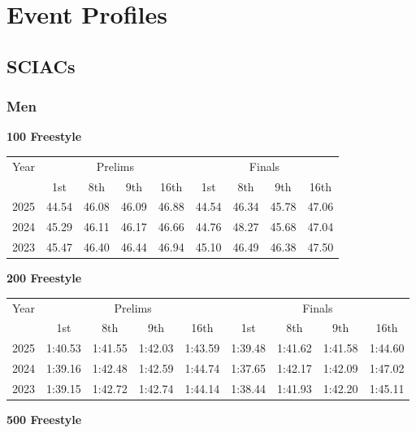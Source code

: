 \section{Event Profiles}

\subsection{SCIACs}

\subsubsection{Men}

\textbf{100 Freestyle}

\begin{flushleft}
\begin{tabular}{|c|c|c|c|c|c|c|c|c|}
\hline
Year & \multicolumn{4}{c|}{Prelims} & \multicolumn{4}{c|}{Finals} \\
\cline{2-9}
& 1st & 8th & 9th & 16th & 1st & 8th & 9th & 16th \\
\hline
2025 & 44.54 & 46.08 & 46.09 & 46.88 & 44.54 & 46.34 & 45.78 & 47.06 \\
2024 & 45.29 & 46.11 & 46.17 & 46.66 & 44.76 & 48.27 & 45.68 & 47.04  \\
2023 & 45.47 & 46.40 & 46.44 & 46.94 & 45.10 & 46.49 & 46.38 & 47.50 \\
\hline
\end{tabular}
\end{flushleft}

\textbf{200 Freestyle}

\begin{flushleft}
\begin{tabular}{|c|c|c|c|c|c|c|c|c|}
\hline
Year & \multicolumn{4}{c|}{Prelims} & \multicolumn{4}{c|}{Finals} \\
\cline{2-9}
& 1st & 8th & 9th & 16th & 1st & 8th & 9th & 16th \\
\hline
2025 & 1:40.53 & 1:41.55 & 1:42.03 & 1:43.59 & 1:39.48 & 1:41.62 & 1:41.58 & 1:44.60 \\
2024 & 1:39.16 & 1:42.48 & 1:42.59 & 1:44.74 & 1:37.65 & 1:42.17 & 1:42.09 & 1:47.02 \\
2023 & 1:39.15 & 1:42.72 & 1:42.74 & 1:44.14 & 1:38.44 & 1:41.93 & 1:42.20 & 1:45.11 \\
\hline
\end{tabular}
\end{flushleft}

\textbf{500 Freestyle}

